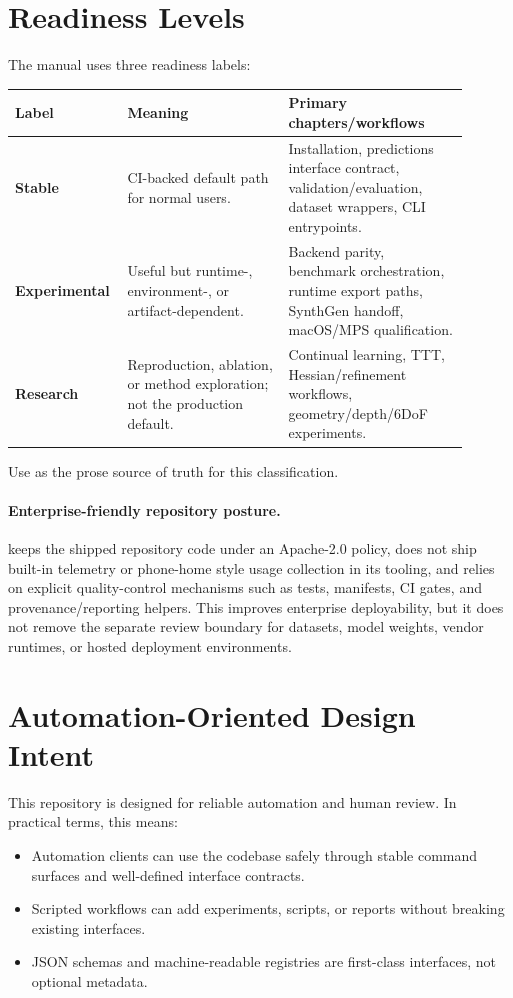 \section{Readiness Levels}

The manual uses three readiness labels:
\begin{center}
\begin{tabular}{p{0.18\linewidth} p{0.34\linewidth} p{0.38\linewidth}}
\textbf{Label} & \textbf{Meaning} & \textbf{Primary chapters/workflows} \\
\hline
\textbf{Stable} & CI-backed default path for normal users. & Installation, predictions interface contract, validation/evaluation, dataset wrappers, CLI entrypoints. \\
\textbf{Experimental} & Useful but runtime-, environment-, or artifact-dependent. & Backend parity, benchmark orchestration, runtime export paths, SynthGen handoff, macOS/MPS qualification. \\
\textbf{Research} & Reproduction, ablation, or method exploration; not the production default. & Continual learning, TTT, Hessian/refinement workflows, geometry/depth/6DoF experiments. \\
\end{tabular}
\end{center}

Use  as the prose source of truth for this classification.

\paragraph{Enterprise-friendly repository posture.}
\yolozu{} keeps the shipped repository code under an Apache-2.0 policy,
does not ship built-in telemetry or phone-home style usage collection in its
tooling, and relies on explicit quality-control mechanisms such as tests,
manifests, CI gates, and provenance/reporting helpers.
This improves enterprise deployability, but it does not remove the separate
review boundary for datasets, model weights, vendor runtimes, or hosted
deployment environments.

\section{Automation-Oriented Design Intent}
This repository is designed for reliable automation and human review.
In practical terms, this means:
\begin{itemize}
  \item Automation clients can use the codebase safely through stable command surfaces and well-defined interface contracts.
  \item Scripted workflows can add experiments, scripts, or reports without breaking existing interfaces.
  \item JSON schemas and machine-readable registries are first-class interfaces, not optional metadata.
\end{itemize}

